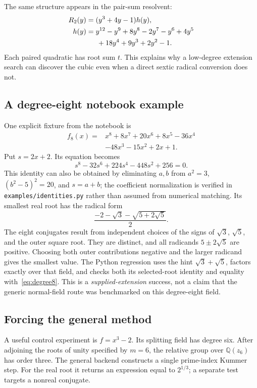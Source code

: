 \documentclass[11pt,a4paper]{article}
\newcommand{\Q}{\mathbb Q}
\newcommand{\code}[1]{\texttt{\small #1}}
\theoremstyle{definition}
\begin{document}
The same structure appears in the pair-sum resolvent:
\begin{align*}
 R_2(y)&=(y^3+4y-1)h(y),\\
 h(y)&=y^{12}-y^9+8y^8-2y^7-y^6+4y^5\\
     &\hspace{1.5em}+18y^4+9y^3+2y^2-1.
\end{align*}
Each paired quadratic has root sum $t$. This explains why a low-degree
extension search can discover the cubic even when a direct sextic radical
conversion does not.

\subsection{A degree-eight notebook example}
One explicit fixture from the notebook is
\begin{align*}
 f_8(x)={}&x^8+8x^7+20x^6+8x^5-36x^4\\
         &-48x^3-15x^2+2x+1.
\end{align*}
Put $s=2x+2$. Its equation becomes
\[
 s^8-32s^6+224s^4-448s^2+256=0.
\]
This identity can also be obtained by eliminating $a,b$ from
$a^2=3$, $(b^2-5)^2=20$, and $s=a+b$; the coefficient normalization is
verified in \code{examples/identities.py} rather than assumed from numerical matching.
Its smallest real root has the radical form
\begin{equation}\label{eq:degree8}
 \frac{-2-\sqrt3-\sqrt{5+2\sqrt5}}2.
\end{equation}
The eight conjugates result from independent choices of the signs of
$\sqrt3$, $\sqrt5$, and the outer square root. They are distinct, and
all radicands $5\pm2\sqrt5$ are positive. Choosing both outer contributions
negative and the larger radicand gives the smallest value. The Python regression
uses the hint $\sqrt3+\sqrt5$, factors exactly over that field, and checks both
its selected-root identity and equality with~\eqref{eq:degree8}. This is a
\emph{supplied-extension} success, not a claim that the generic normal-field
route was benchmarked on this degree-eight field.

\subsection{Forcing the general method}
A useful control experiment is $f=x^3-2$. Its splitting field has degree six.
After adjoining the roots of unity specified by $m=6$, the relative group over
$\Q(z_6)$ has order three. The general backend constructs a single prime-index
Kummer step. For the real root it returns an expression equal to $2^{1/3}$;
a separate test targets a nonreal conjugate.
\end{document}
